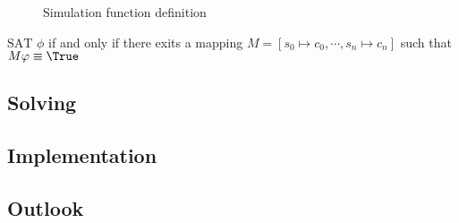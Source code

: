 \begin{figure*}
\caption{Simulation function definition}
\label{fig:simulate}
\end{figure*}
\begin{definition}
  \label{def:Sat}
  $\text{SAT }\phi$ if and only if there exits a mapping $M=[s_0\mapsto c_0,\cdots,s_n\mapsto c_n]$ such that $M\phi\equiv\True$
\end{definition}

\subsection{Solving}


\subsection{Implementation}
\subsection{Outlook}

